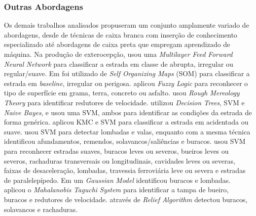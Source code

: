 \subsubsection{Outras Abordagens}

Os demais trabalhos analisados propuseram um conjunto amplamente variado de abordagens, desde de técnicas de caixa branca com inserção de conhecimento especializado até abordagens de caixa preta que empregam aprendizado de máquina. Na produção de exterocepção, \cite{Jang2015} usou uma \textit{Multilayer Feed Forward Neural Network} para classificar a estrada em classe de abrupta, irregular ou regular/suave. Em \cite{Selmanaj2014} foi utilizado de \textit{Self Organizing Maps} (SOM) para classificar a estrada em \textit{baseline}, irregular ou perigosa. \cite{Khaleghian2017} aplicou \textit{Fuzzy Logic} para reconhecer o tipo de superfície em grama, terra, concreto ou asfalto. \cite{Fouad2014} usou \textit{Rough Mereology Theory} para identificar redutores de velocidade. \cite{Allouch2017} utilizou \textit{Decision Trees}, SVM e \textit{Naive Bayes}, e \cite{Singh2018} usou uma SVM, ambos para identificar as condições da estrada de forma genérica. \cite{Nalavde2015} aplicou KMC e SVM para classificar a estrada em acidentada ou suave. \cite{Savera2016} usou SVM para detectar lombadas e valas, enquanto \cite{Gueta2017} com a mesma técnica identificou afundamentos, remendos, solavancos/saliências e buracos. \cite{El-Wakeel2018} usou SVM para reconhecer estradas suaves, buracos leves ou severos, bueiros leves ou severos, rachaduras transversais ou longitudinais, cavidades leves ou severas, faixas de desaceleração, lombadas, travessia ferroviária leve ou severa e estradas de paralelepípedo. Em \cite{M.2017} um \textit{Gaussian Model} identificou buracos e lombadas. \cite{Wang2018} aplicou o \textit{Mahalanobis Taguchi System} para identificar a tampa de bueiro, buracos e redutores de velocidade. \cite{Wickramarathne2018} através de \textit{Relief Algorithm} detectou buracos, solavancos e rachaduras.


